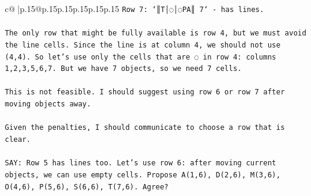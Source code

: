 \documentclass{article}
\begin{document}
{\begin{supertabular}{c@{$\;$}|p{.15\linewidth}@{}p{.15\linewidth}p{.15\linewidth}p{.15\linewidth}p{.15\linewidth}p{.15\linewidth}}
{{{\texttt{Row 7: `║T│◌│◌PA║ 7` {-} has lines.} \\
\\ 
\texttt{The only row that might be fully available is row 4, but we must avoid the line cells. Since the line is at column 4, we should not use (4,4). So let's use only the cells that are ◌ in row 4: columns 1,2,3,5,6,7. But we have 7 objects, so we need 7 cells.} \\
\\ 
\texttt{This is not feasible. I should suggest using row 6 or row 7 after moving objects away.} \\
\\ 
\texttt{Given the penalties, I should communicate to choose a row that is clear.} \\
\\ 
\texttt{SAY: Row 5 has lines too. Let's use row 6: after moving current objects, we can use empty cells. Propose A(1,6), D(2,6), M(3,6), O(4,6), P(5,6), S(6,6), T(7,6). Agree?} \\
            }
        }
    }
     \\ \\


\end{supertabular}}
\end{document}

